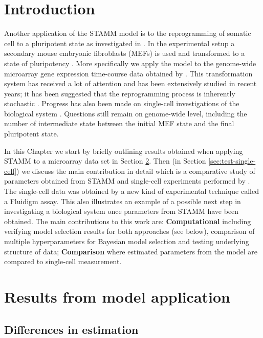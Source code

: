 \section{Introduction}
\label{sec:introduction-rep}

Another application of the STAMM model is to the reprogramming of somatic cell to a pluripotent state as investigated in \cite{Armond:2013}. In the experimental setup a secondary mouse embryonic fibroblasts (MEFs) is used and transformed to a state of pluripotency \citep{Takahashi:2006hi,Jaenisch:2008cz}. More specifically we apply the model to the genome-wide microarray gene expression time-course data obtained by \cite{SamavarchiTehrani:2010cp}. This transformation system has received a lot of attention and has been extensively studied in recent years; it has been suggested that the reprogramming process is inherently stochastic \citep{Hanna:2009ix}. Progress has also been made on single-cell investigations of the biological system \citep{Buganim:2012hp}. Questions still remain on genome-wide level, including the number of intermediate state between the initial MEF state and the final pluripotent state. 

In this Chapter we start by briefly outlining results obtained \cite{Armond:2013} when applying STAMM to a microarray data set in Section \ref{sec:iPsc-results}. Then (in Section \ref{sec:test-single-cell}) we discuss the main contribution in detail which is a comparative study of parameters obtained from STAMM and single-cell experiments performed by \cite{Buganim:2012hp}. The single-cell data was obtained by a new kind of experimental technique called a Fluidigm assay. This also illustrates an example of a possible next step in investigating a biological system once parameters from STAMM have been obtained. The main contributions to this work are: {\bf Computational} including verifying model selection results for both approaches (see below), comparison of multiple hyperparameters for Bayesian model selection and testing underlying structure of data; {\bf Comparison} where estimated parameters from the model are compared to single-cell measurement.

\section{Results from model application}
\label{sec:iPsc-results}

\subsection{Differences in estimation}
\label{sec:diff-estim}

